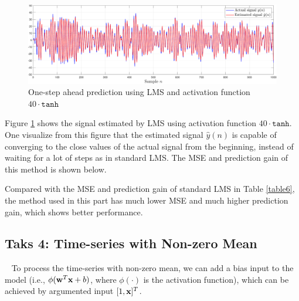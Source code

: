 \documentclass[10pt]{article}
\begin{document}
\begin{figure}[htbp]
    \centering
	\includegraphics[width=1\textwidth]{fig/4.3_1.pdf}

    \caption{One-step ahead prediction using LMS and activation function $ 40 \cdot \mathtt{tanh}$}
    \label{fig29}
\end{figure}

Figure \ref{fig29} shows the signal estimated by LMS using activation function 
$ 40 \cdot \mathtt{tanh}$. One visualize from this figure that the estimated 
signal $\hat{y}(n)$ is capable of converging to the close values of the actual signal
from the beginning, instead of waiting for a lot of steps as in standard LMS.
 The MSE and prediction gain of this method is shown below.

\begin{table}[htbp]
	\caption{Scaled activation function for time-series with zero-mean}
	\centering
\end{table}
Compared with the MSE and prediction gain of standard LMS in Table \ref{table6}, the 
method used in this part has much lower MSE and much higher prediction gain, which shows 
better performance.

\subsection{Taks 4: Time-series with Non-zero Mean} \label{part4.4}
\ \indent
To process the time-series with non-zero mean, we can add a bias input to the model
(i.e., $\phi ({\bf{w}}^T {\bf{x}} + b)$, where $\phi(\cdot)$ is the activation function), 
which can be achieved by argumented input $[1, {\bf{x}}]^T$.
\end{document}
